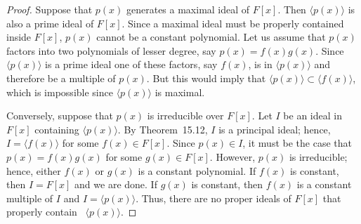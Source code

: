  
\begin{proof}
Suppose that $p(x)$ generates a maximal ideal of $F[x]$. Then $\langle
p(x) \rangle$ is also a prime ideal of $F[x]$. Since a maximal ideal
must be properly contained inside $F[x]$, $p(x)$ cannot be a constant
polynomial. Let us assume that $p(x)$ factors into two polynomials of
lesser degree, say $p(x) = f(x) g(x)$. Since $\langle p(x) \rangle$ is
a prime ideal one of these factors, say $f(x)$, is in $\langle p(x)
\rangle$ and therefore be a multiple of $p(x)$. But this would imply
that $\langle p(x) \rangle \subset \langle f(x) \rangle$, which is 
impossible since $\langle p(x) \rangle$ is maximal.
 
 
Conversely, suppose that $p(x)$ is irreducible over $F[x]$. Let $I$ be
an ideal in $F[x]$ containing $\langle p(x) \rangle$. By Theorem~15.12,
$I$ is a principal ideal; hence, $I = \langle f(x) \rangle$ for some
$f(x) \in F[x]$. Since $p(x) \in I$, it must be the case that $p(x) =
f(x) g(x)$ for some $g(x) \in F[x]$. However, $p(x)$ is irreducible;
hence, either $f(x)$ or $g(x)$ is a constant polynomial. If $f(x)$ is
constant, then $I = F[x]$ and we are done.  If $g(x)$ is constant, then
$f(x)$ is a constant multiple of $I$ and $I = \langle p(x) \rangle$.
Thus, there are no proper ideals of $F[x]$ that properly contain~
\mbox{$\langle p(x)\rangle$}. 
\end{proof}

\histhead

